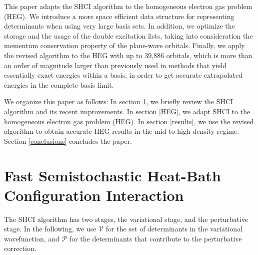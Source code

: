 \documentclass[%
reprint,
 superscriptaddress,
 amsmath,amssymb,
 aps,
]{revtex4-1}
\def\V{\mathcal{V}}
\def\P{\mathcal{P}}
\begin{document}
This paper adapts the SHCI algorithm to the homogeneous electron gas problem (HEG).
We introduce a more space efficient data structure for representing determinants when using very
large basis sets.
In addition, we optimize the storage and the usage of the double excitation lists, taking into consideration the mementum conservation property of the plane-wave orbitals.
Finally, we apply the revised algorithm to the HEG with up to 39,886 orbitals, which is more than
an order of magnitude larger than previously used in methods that yield essentially exact energies within a basis,
in order to get accurate extrapolated energies in the complete basis limit.

We organize this paper as follows:
In section \ref{SHCI}, we briefly review the SHCI algorithm and its recent improvements.
In section \ref{HEG}, we adapt SHCI to the homogeneous electron gas problem (HEG).
In section \ref{results}, we use the revised algorithm to obtain accurate HEG results in the mid-to-high density regime.
Section \ref{conclusions} concludes the paper.

\section{Fast Semistochastic Heat-Bath Configuration Interaction}
\label{SHCI}

The SHCI algorithm has two stages, the variational stage, and the perturbative stage.
In the following, we use $\V$ for the set of determinants in the variational wavefunction, and $\P$ for the determinants that contribute to the perturbative correction.
\end{document}

